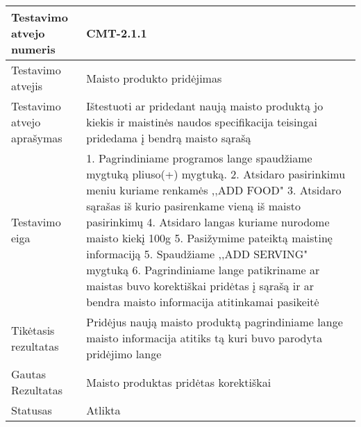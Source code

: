 \documentclass[oneside]{VUMIFPSkursinis}
\begin{document}
\begin{center}
    \begin{tabular}{ |p{5cm}|p{13cm}|}
    \hline
    	Testavimo atvejo numeris & CMT-2.1.1\\ \hline
    	Testavimo atvejis & Maisto produkto pridėjimas \\ \hline
	Testavimo atvejo aprašymas & Ištestuoti ar pridedant naują maisto produktą jo kiekis ir maistinės naudos specifikacija teisingai pridedama į bendrą maisto sąrašą   \\ \hline
	Testavimo eiga &1. Pagrindiniame programos lange spaudžiame mygtuką pliuso(+) mygtuką. 
				2. Atsidaro pasirinkimu meniu kuriame renkamės ,,ADD FOOD"
				3. Atsidaro sąrašas iš kurio pasirenkame vieną iš maisto pasirinkimų
				4. Atsidaro langas kuriame nurodome maisto kiekį 100g
				5. Pasižymime pateiktą maistinę informaciją
				5. Spaudžiame ,,ADD SERVING"  mygtuką
				6. Pagrindiniame lange patikriname ar maistas buvo korektiškai pridėtas į sąrašą ir ar bendra maisto informacija atitinkamai pasikeitė \\ \hline
	Tikėtasis rezultatas &  Pridėjus naują maisto produktą pagrindiniame lange maisto informacija atitiks tą kuri buvo parodyta pridėjimo lange\\ \hline
	Gautas Rezultatas & Maisto produktas pridėtas korektiškai  \\ \hline
	Statusas &  Atlikta\\ \hline
    \hline
    \end{tabular}
\end{center}
\end{document}
